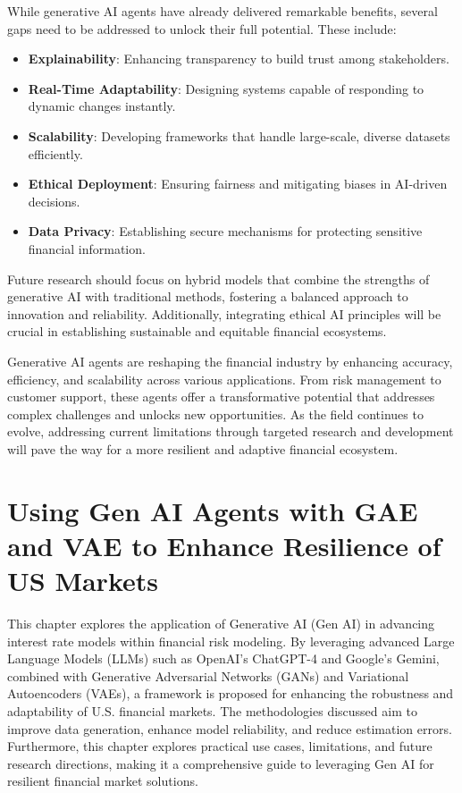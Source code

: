 \documentclass[a4paper,headinclude=on,footinclude=on,12pt,oneside]{scrbook}
\begin{document}
	
	While generative AI agents have already delivered remarkable benefits, several gaps need to be addressed to unlock their full potential. These include:
	
	\begin{itemize}
		\item \textbf{Explainability}: Enhancing transparency to build trust among stakeholders.
		\item \textbf{Real-Time Adaptability}: Designing systems capable of responding to dynamic changes instantly.
		\item \textbf{Scalability}: Developing frameworks that handle large-scale, diverse datasets efficiently.
		\item \textbf{Ethical Deployment}: Ensuring fairness and mitigating biases in AI-driven decisions.
		\item \textbf{Data Privacy}: Establishing secure mechanisms for protecting sensitive financial information.
	\end{itemize}
	
	Future research should focus on hybrid models that combine the strengths of generative AI with traditional methods, fostering a balanced approach to innovation and reliability. Additionally, integrating ethical AI principles will be crucial in establishing sustainable and equitable financial ecosystems.
	
	
	Generative AI agents are reshaping the financial industry by enhancing accuracy, efficiency, and scalability across various applications. From risk management to customer support, these agents offer a transformative potential that addresses complex challenges and unlocks new opportunities. As the field continues to evolve, addressing current limitations through targeted research and development will pave the way for a more resilient and adaptive financial ecosystem.
	
	
	\chapter{Using Gen AI Agents with GAE and VAE to Enhance Resilience of US Markets}
	
	This chapter explores the application of Generative AI (Gen AI) in advancing interest rate models within financial risk modeling. By leveraging advanced Large Language Models (LLMs) such as OpenAI’s ChatGPT-4 and Google’s Gemini, combined with Generative Adversarial Networks (GANs) and Variational Autoencoders (VAEs), a framework is proposed for enhancing the robustness and adaptability of U.S. financial markets. The methodologies discussed aim to improve data generation, enhance model reliability, and reduce estimation errors. Furthermore, this chapter explores practical use cases, limitations, and future research directions, making it a comprehensive guide to leveraging Gen AI for resilient financial market solutions.
	
\end{document}
